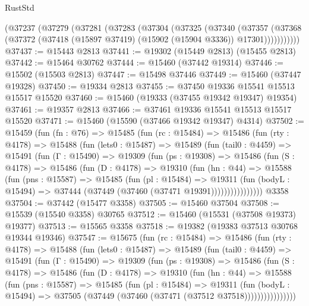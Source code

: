 \begin{lexlean}{RustStd}
\begin{coremodule}
    (@37237
      (@37279
        (@37281
          (@37283
            (@37304
              (@37325
                (@37340
                  (@37357
                    (@37368
                      (@37372 (@37418 (@15897 @37419) (@15902 (@15904 @3336)) @17301)))))))))))
@37437 := @15443 @2813
@37441 := @19302 (@15449 @2813) (@15455 @2813)
@37442 := @15464 @30762
@37444 := @15460 (@37442 @19314)
@37446 := @15502 (@15503 @2813)
@37447 := @15498 @37446
@37449 := @15460 (@37447 @19328)
@37450 := @19334 @2813
@37455 := @37450 @19336 @15541 @15513 @15517 @15520
@37460 := @15460 (@19333 (@37455 @19342 @19347) @19354)
@37461 := @19357 @2813
@37466 := @37461 @19336 @15541 @15513 @15517 @15520
@37471 := @15460 (@15590 (@37466 @19342 @19347) @4314)
@37502 := @15459
    (fun (fn : @76) =>
    @15485
      (fun (rc : @15484) =>
      @15486
        (fun (rty : @4178) =>
        @15488
          (fun (lets0 : @15487) =>
          @15489
            (fun (tail0 : @4459) =>
            @15491
              (fun (Γ : @15490) =>
              @19309
                (fun (ps : @19308) =>
                @15486
                  (fun (S : @4178) =>
                  @15486
                    (fun (D : @4178) =>
                    @19310
                      (fun (hn : @44) =>
                      @15588
                        (fun (pns : @15587) =>
                        @15485
                          (fun (pl : @15484) =>
                          @19311
                            (fun (bodyL : @15494) =>
                            @37444 (@37449 (@37460 (@37471 @19391))))))))))))))))
    @3358
@37504 := @37442 (@15477 @3358)
@37505 := @15460 @37504
@37508 := @15539 (@15540 @3358) @30765
@37512 := @15460 (@15531 (@37508 @19373) @19377)
@37513 := @15565 @3358
@37518 := @19382 (@19383 @37513 @30768 @19344 @19346)
@37547 := @15675
    (fun (rc : @15484) =>
    @15486
      (fun (rty : @4178) =>
      @15488
        (fun (lets0 : @15487) =>
        @15489
          (fun (tail0 : @4459) =>
          @15491
            (fun (Γ : @15490) =>
            @19309
              (fun (ps : @19308) =>
              @15486
                (fun (S : @4178) =>
                @15486
                  (fun (D : @4178) =>
                  @19310
                    (fun (hn : @44) =>
                    @15588
                      (fun (pns : @15587) =>
                      @15485
                        (fun (pl : @15484) =>
                        @19311
                          (fun (bodyL : @15494) =>
                          @37505 (@37449 (@37460 (@37471 (@37512 @37518))))))))))))))))

\end{coremodule}
\end{lexlean}
